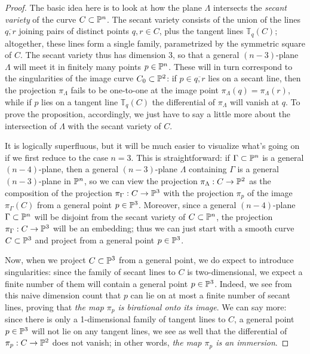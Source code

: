 \begin{proof} The basic idea here is to look at how the plane $\Lambda$ intersects the \emph{secant variety} of the curve $C \subset {\mathbb P}^n$. The secant variety consists of the union of the lines $\overline{q,r}$ joining pairs of distinct points $q,r \in C$, plus the tangent lines ${\mathbb T}_q(C)$; altogether, these lines form a single family, parametrized by the symmetric square of $C$. The secant variety thus has dimension 3, so that a general $(n-3)$-plane $\Lambda$ will meet it in finitely many points $p \in {\mathbb P}^n$. These will in turn correspond to the singularities of the image curve $C_0 \subset {\mathbb P}^2$: if $p \in \overline{q,r}$ lies on a secant line, then the projection $\pi_\Lambda$ fails to be one-to-one at the image point $\pi_\Lambda(q) = \pi_\Lambda(r)$, while if $p$ lies on a tangent line ${\mathbb T}_q(C)$ the differential of $\pi_\Lambda$ will vanish at $q$. To prove the proposition, accordingly, we just have to say a little more about the intersection of $\Lambda$ with the secant variety of $C$. 


It is logically superfluous, but it will be much easier to visualize what's going on if we first reduce to the case $n=3$. This is straightforward: if $\Gamma \subset {\mathbb P}^n$ is a general $(n-4)$-plane, then a general $(n-3)$-plane $\Lambda$ containing $\Gamma$ is a general $(n-3)$-plane in ${\mathbb P}^n$, so we can view the projection $\pi_\Lambda : C \to {\mathbb P}^2$ as the composition of the projection $\pi_\Gamma : C \to {\mathbb P}^3$ with the projection $\pi_p$ of the image $\pi_\Gamma(C)$ from a general point $p \in {\mathbb P}^3$. Moreover, since a general  $(n-4)$-plane $\Gamma \subset {\mathbb P}^n$ will be disjoint from the secant variety of $C \subset {\mathbb P}^n$, the projection $\pi_\Gamma : C \to {\mathbb P}^3$ will be an embedding; thus we can just start with a smooth curve $C \subset {\mathbb P}^3$ and project from a general point $p \in {\mathbb P}^3$.


Now, when we project $C \subset {\mathbb P}^3$ from a general point, we do expect to introduce singularities: since the family of secant lines to $C$ is two-dimensional,  we expect a finite number of them will contain a general point $p \in {\mathbb P}^3$. Indeed, we see from this naive dimension count that $p$ can lie on at most a finite number of secant lines, proving that \emph{the map $\pi_p$ is birational onto its image}. We can say more: since there is only a 1-dimensional family of tangent lines to $C$, a general point $p \in {\mathbb P}^3$ will not lie on any tangent lines, we see as well that the differential of $\pi_p : C \to {\mathbb P}^2$ does not vanish; in other words, \emph{the map $\pi_p$ is an immersion}.


\end{proof}
